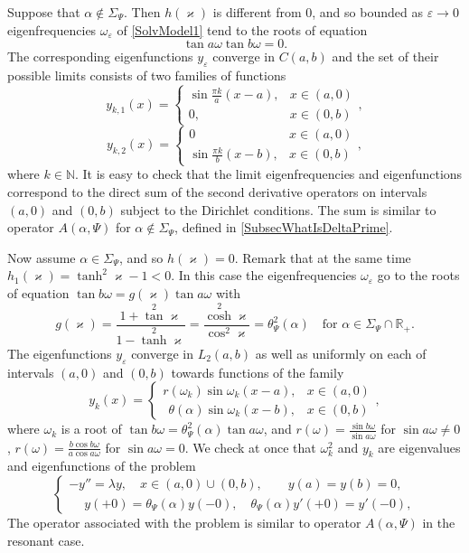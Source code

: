 \documentclass[11pt,english]{amsart}
\begin{document}
Suppose that  $\alpha\not\in \Sigma_\Psi$. Then  $h(\varkappa)$ is different from $0$, and so
bounded as $\varepsilon\to 0$ eigenfrequencies $\omega_\varepsilon$ of \eqref{SolvModel1} tend to the roots of equation $$\operatorname*{tan} a\omega\operatorname*{tan} b\omega=0.$$ The corresponding eigenfunctions $y_\varepsilon$ converge in $C(a,b)$ and the set of their possible limits consists of two families of functions
$$
  y_{k,1}(x)=
    \begin{cases}
    \sin\frac{\pi k}{a}(x-a),& x\in(a,0)\\
    0,& x\in(0,b)
    \end{cases},
$$
$$
 y_{k,2}(x)=
    \begin{cases}
    0& x\in(a,0)\\
    \sin\frac{\pi k}{b}(x-b),& x\in (0,b)
    \end{cases},
$$
where $k\in \mathbb{N}$.
It is easy to check that the limit eigenfrequencies and eigenfunctions correspond to the direct sum of the second
derivative operators on intervals $(a,0)$ and $(0,b)$ subject to the Dirichlet conditions.
The sum is similar to operator
$A(\alpha,\Psi)$ for $\alpha\not\in \Sigma_\Psi$,  defined in \ref{SubsecWhatIsDeltaPrime}.

Now assume $\alpha\in \Sigma_\Psi$, and so $h(\varkappa)=0$. Remark that at the same time
$h_1(\varkappa)=\operatorname*{tanh}^2\varkappa-1<0$.
In this case the eigenfrequencies $\omega_\varepsilon$ go to the roots of equation
 $\operatorname*{tan} b\omega=g(\varkappa)\operatorname*{tan} a\omega$ with
$$
   g(\varkappa)=\frac{1+\operatorname*{tan}^2\varkappa}{1-\operatorname*{tanh}^2\varkappa}=\frac{\operatorname*{cosh}^2\varkappa}{\cos^2\varkappa}=\theta_\Psi^2 (\alpha)\quad\text{for } \alpha\in \Sigma_\Psi\cap\mathbb R_+.
$$
The eigenfunctions $y_\varepsilon$ converge in $L_2(a,b)$ as well as uniformly on each of intervals  $(a,0)$ and $(0,b)$ towards  functions of the family
\begin{equation*}
y_k(x)=
    \begin{cases}
       r(\omega_k)\sin\omega_k(x-a),&x\in(a,0)\\
    \:\:\theta(\alpha)\sin\omega_k(x-b),&x\in(0,b)
        \end{cases},
\end{equation*}
where $\omega_k$ is a root of  $\operatorname*{tan} b\omega=\theta_\Psi^2 (\alpha)\operatorname*{tan} a\omega$, and
$r(\omega)=\frac{\sin b\omega}{\sin a\omega}$ for $\sin a\omega\neq 0$,
$r(\omega)=\frac{b\cos b\omega}{a\cos a\omega}$ for $\sin a\omega= 0$.
We check at once that $\omega_k^2$ and  $y_k$ are eigenvalues and eigenfunctions of the problem
\begin{equation*}
\begin{cases}
  -y''=\lambda y, \quad x\in (a,0)\cup (0,b),\qquad y(a)=y(b)=0,\\
  \phantom{-}y(+0)=\theta_\Psi (\alpha)y(-0),\quad \theta_\Psi (\alpha)y'(+0)=y'(-0),
\end{cases}
\end{equation*}
The operator associated with the problem is similar to operator
$A(\alpha,\Psi)$ in the resonant case.
\end{document}
